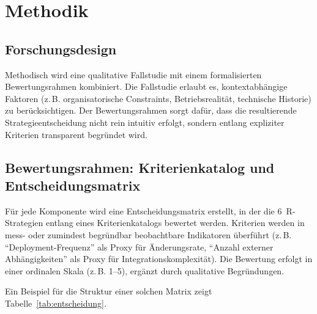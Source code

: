 \section{Methodik}

\subsection{Forschungsdesign}

Methodisch wird eine qualitative Fallstudie mit einem formalisierten Bewertungsrahmen kombiniert. Die Fallstudie erlaubt es, kontextabhängige 
Faktoren (z.\,B. organisatorische Constraints, Betriebsrealität, technische Historie) zu berücksichtigen. Der Bewertungsrahmen sorgt dafür, dass die resultierende Strategieentscheidung 
nicht rein intuitiv erfolgt, sondern entlang expliziter Kriterien transparent begründet wird.

\subsection{Bewertungsrahmen: Kriterienkatalog und Entscheidungsmatrix}

Für jede Komponente wird eine Entscheidungsmatrix erstellt, in der die 6~R-Strategien entlang eines Kriterienkatalogs bewertet werden.
 Kriterien werden in mess- oder zumindest begründbar beobachtbare Indikatoren überführt (z.\,B. \enquote{Deployment-Frequenz} als Proxy für Änderungsrate, \enquote{Anzahl externer Abhängigkeiten} als Proxy
  für Integrationskomplexität). Die Bewertung erfolgt in einer ordinalen Skala (z.\,B. 1--5), ergänzt durch qualitative Begründungen.

Ein Beispiel für die Struktur einer solchen Matrix zeigt Tabelle~\ref{tab:entscheidung}.

\begin{table}[ht]
\centering
\footnotesize
{}
\caption{Schematische Entscheidungsmatrix (Beispielstruktur; Werte komponentenspezifisch)}
\label{tab:entscheidung}
\end{table}

